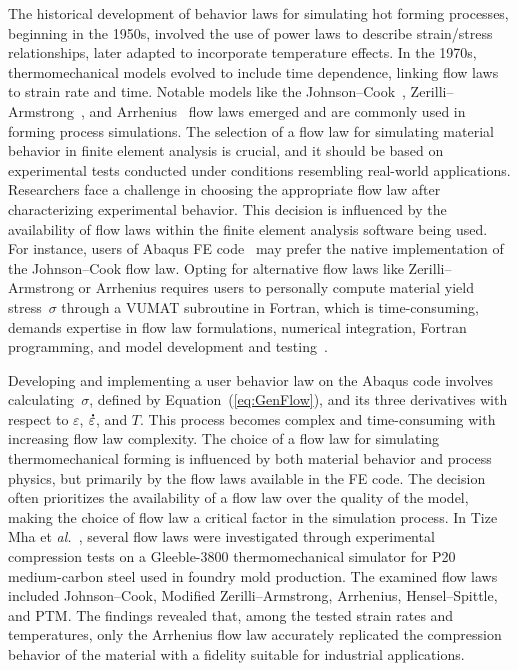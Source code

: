 \documentclass[algorithms,article,submit,pdftex,oneauthors]{Definitions/mdpi}
\makeatletter
\DeclareRobustCommand{\mdot}[1]{\accentset{\mbox{\bfseries .}}{#1}}
\DeclareRobustCommand{\eal}{et \emph{al.}\@\xspace}
\makeatother
\begin{document}
The historical development of behavior laws for simulating hot forming processes, beginning in the 1950s, involved the use of power laws to describe strain/stress relationships, later adapted to incorporate temperature effects.
In the 1970s, thermomechanical models evolved to include time dependence, linking flow laws to strain rate and time.
Notable models like the Johnson--Cook~\cite{Johnson-1983-CMD}, Zerilli--Armstrong~\cite{Zerilli-1987-DMB}, and Arrhenius~\cite{Jonas-1969} flow laws emerged and are commonly used in forming process simulations.
The selection of a flow law for simulating material behavior in finite element analysis is crucial, and it should be based on experimental tests conducted under conditions resembling real-world applications.
Researchers face a challenge in choosing the appropriate flow law after characterizing experimental behavior.
This decision is influenced by the availability of flow laws within the finite element analysis software being used.
For instance, users of Abaqus FE code~\cite{Abaqus} may prefer the native implementation of the Johnson--Cook flow law.
Opting for alternative flow laws like Zerilli--Armstrong or Arrhenius requires users to personally compute material yield stress~$\sigma$ through a VUMAT subroutine in Fortran, which is time-consuming, demands expertise in flow law formulations, numerical integration, Fortran programming, and model development and testing~\cite{Gao-2007-FRT, Ming-2018-ERV, Liang-2022}.

Developing and implementing a user behavior law on the Abaqus code involves calculating~$\sigma$, defined by Equation~(\ref{eq:GenFlow}), and its three derivatives with respect to $\varepsilon$, $\mdot{\varepsilon}$, and $T$.
This process becomes complex and time-consuming with increasing flow law complexity.
The choice of a flow law for simulating thermomechanical forming is influenced by both material behavior and process physics, but primarily by the flow laws available in the FE code.
The decision often prioritizes the availability of a flow law over the quality of the model, making the choice of flow law a critical factor in the simulation process.
In Tize Mha \eal~\cite{Tize-2023-IEP}, several flow laws were investigated through experimental compression tests on a Gleeble-3800 thermomechanical simulator for P20 medium-carbon steel used in foundry mold production.
The examined flow laws included Johnson--Cook, Modified Zerilli--Armstrong, Arrhenius, Hensel--Spittle, and PTM.
The findings revealed that, among the tested strain rates and temperatures, only the Arrhenius flow law accurately replicated the compression behavior of the material with a fidelity suitable for industrial applications.
\end{document}
